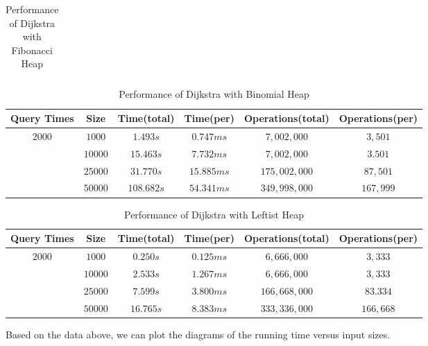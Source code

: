 \documentclass[twoside]{article}
\begin{document}
\begin{CJK*}{UTF8}{gbsn}
\begin{table}[H]
\begin{tabular}{|c|c|c|c|c|c|}
        \hline
    \end{tabular}
    \caption{Performance of Dijkstra with Fibonacci Heap}
\end{table}
\begin{table}[H]
    \centering
\begin{tabular}{|c|c|c|c|c|c|}
    \hline
    Query Times & Size & Time(total) & Time(per) & Operations(total) & Operations(per)  \\
    \hline
    \multirow{3}{*}{$2000$}& $1000$ & $1.493s$ & $0.747ms$ & $7,002,000$ & $3,501$ \\
    \cline{2-6}
    & $10000$ & $15.463s$ & $7.732ms$ & $7,002,000$ & $3.501$ \\
    \cline{2-6}
    & $25000$ & $31.770s$ & $15.885ms$ & $175,002,000$ & $87,501$\\
    \cline{2-6}
    & $50000$ & $108.682s$ & $54.341ms$ & $349,998,000$ & $167,999$\\
    \hline
\end{tabular}
\caption{Performance of Dijkstra with Binomial Heap}
\end{table}
\begin{table}[H]
    \centering
\begin{tabular}{|c|c|c|c|c|c|}
    \hline
    Query Times & Size & Time(total) & Time(per) & Operations(total) & Operations(per)  \\
    \hline
    \multirow{3}{*}{$2000$}& $1000$ & $0.250s$ & $0.125ms$ & $6,666,000$ & $3,333$ \\
    \cline{2-6}
    & $10000$ & $2.533s$ & $1.267ms$ & $6,666,000$ & $3,333$ \\
    \cline{2-6}
    & $25000$ & $7.599s$ & $3.800ms$ & $166,668,000$ & $83.334$\\
    \cline{2-6}
    & $50000$ & $16.765s$ & $8.383ms$ & $333,336,000$ & $166,668$\\
    \hline
\end{tabular}
\caption{Performance of Dijkstra with Leftist Heap}
\end{table}
Based on the data above, we can plot the diagrams of the running time versus input sizes. 
\begin{figure}[H]
    \centering
\end{figure}
\end{CJK*}
\end{document}
